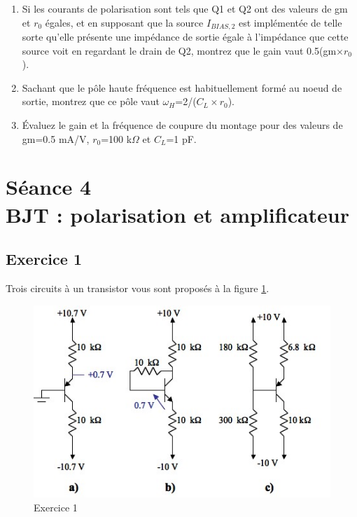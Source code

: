 \documentclass[paper=a4, fontsize=11pt]{article} %
\numberwithin{equation}{section} %
\numberwithin{figure}{section} %
\numberwithin{table}{section} %
\begin{document}
\begin{enumerate}
	\item Si les courants de polarisation sont tels que Q1 et Q2 ont des valeurs de gm et $r_0$ égales, et en supposant que la source $I_{BIAS,2}$ est implémentée de telle sorte qu'elle présente une impédance de sortie égale à l'impédance que cette source voit en regardant le drain de Q2, montrez que le gain vaut 0.5(gm$\times r_0$).
	\item Sachant que le pôle haute fréquence est habituellement formé au noeud de sortie, montrez que ce pôle vaut $\omega_H$=2/($C_L\times r_0$).
	\item Évaluez le gain et la fréquence de coupure du montage pour des valeurs de gm=0.5 mA/V, $r_0$=100 k$\Omega$ et $C_L$=1 pF.
\end{enumerate}















\newpage
\setcounter{figure}{0}
\setcounter{section}{4}
\section{Séance 4\\ BJT : polarisation et amplificateur}
\subsection*{Exercice 1}
Trois circuits à un transistor vous sont proposés à la figure \ref{fig4-1}.

\begin{figure}[!htbp]
   \centering
   \includegraphics[]{figure/fig4-1.png}
   \caption{Exercice 1}
   \label{fig4-1}
\end{figure}
\end{document}
